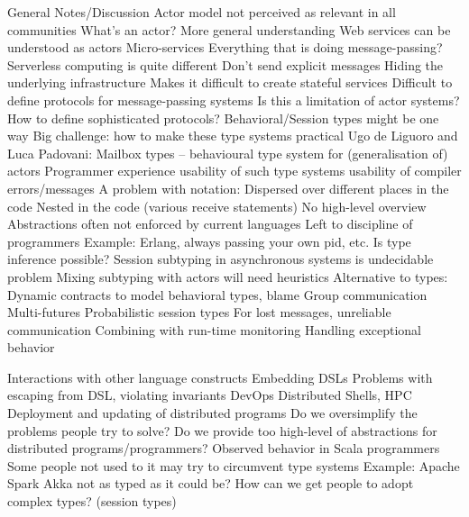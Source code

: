 \documentclass[
graybox,
envcountchap,
]{svmult}
\begin{document}
\begin{bibunit}
General Notes/Discussion
Actor model not perceived as relevant in all communities
What’s an actor?
More general understanding
Web services can be understood as actors
Micro-services
Everything that is doing message-passing?
Serverless computing is quite different
Don’t send explicit messages
Hiding the underlying infrastructure
Makes it difficult to create stateful services
Difficult to define protocols for message-passing systems
Is this a limitation of actor systems?
How to define sophisticated protocols?
Behavioral/Session types might be one way
Big challenge: how to make these type systems practical
Ugo de Liguoro and Luca Padovani: Mailbox types -- behavioural type system for (generalisation of) actors
Programmer experience
usability of such type systems
usability of compiler errors/messages
A problem with notation:
Dispersed over different places in the code
Nested in the code (various receive statements)
No high-level overview
Abstractions often not enforced by current languages
Left to discipline of programmers
Example: Erlang, always passing your own pid, etc.
Is type inference possible?
Session subtyping in asynchronous systems is undecidable problem
Mixing subtyping with actors will need heuristics
Alternative to types:
Dynamic contracts to model behavioral types, blame
Group communication
Multi-futures
Probabilistic session types
For lost messages, unreliable communication
Combining with run-time monitoring
Handling exceptional behavior


Interactions with other language constructs
Embedding DSLs
Problems with escaping from DSL, violating invariants
DevOps
Distributed Shells, HPC
Deployment and updating of distributed programs
Do we oversimplify the problems people try to solve?
Do we provide too high-level of abstractions for distributed programs/programmers?
Observed behavior in Scala programmers
Some people not used to it may try to circumvent type systems
Example: Apache Spark
Akka not as typed as it could be?
How can we get people to adopt complex types? (session types)





\end{bibunit}
\end{document}

